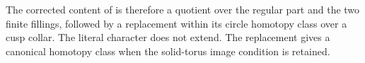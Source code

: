 The corrected content of \cite[Remark 8.3]{mapsEngel} is
therefore a quotient over the regular part and the two finite
fillings, followed by a replacement within its circle homotopy
class over a cusp collar.  The literal character does not
extend.  The replacement gives a canonical homotopy class
when the solid-torus image condition is retained.

